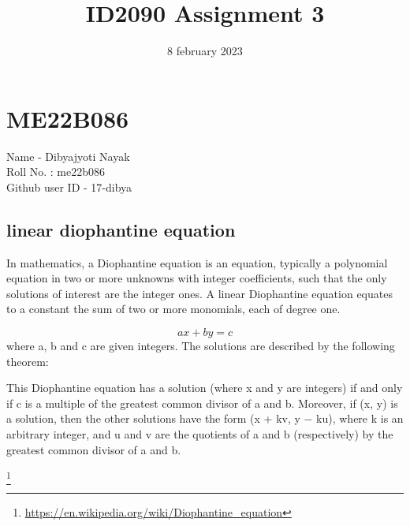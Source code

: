\title{ID2090 Assignment 3}
\date{8 february 2023}


\maketitle

\section{ME22B086}

Name - Dibyajyoti Nayak \\
Roll No. : me22b086 \\
Github user ID - 17-dibya \\

\subsection{linear diophantine equation}
In mathematics, a Diophantine equation is an equation, typically a polynomial equation in two or more unknowns with integer coefficients, such that the only solutions of 
interest are the integer ones. A linear Diophantine equation equates to a constant the sum of two or more monomials, each of degree one.

\begin{equation}
   ax + by = c
\end{equation}
where a, b and c are given integers. The solutions are described by the following theorem:

This Diophantine equation has a solution (where x and y are integers) if and only if c is a multiple of the greatest common divisor of a and b. Moreover, if (x, y) is a 
solution, then the other solutions have the form (x + kv, y − ku), where k is an arbitrary integer, and u and v are the quotients of a and b (respectively) by the 
greatest common divisor of a and b.

\footnote{
\url{https://en.wikipedia.org/wiki/Diophantine_equation}
}
